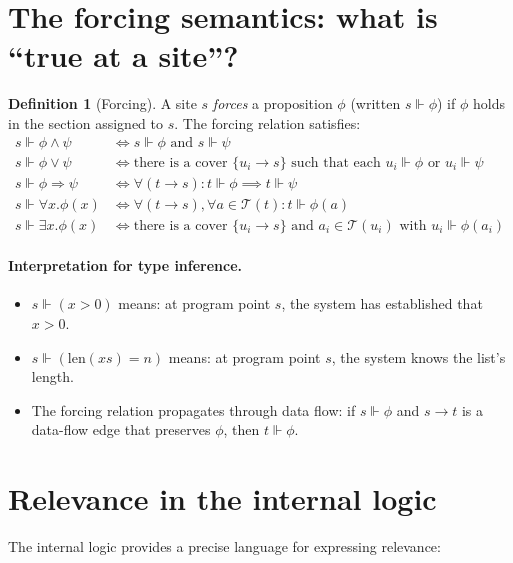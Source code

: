 \documentclass[11pt]{report}
\theoremstyle{definition}
\newtheorem{definition}{Definition}[section]
\theoremstyle{plain}
\begin{document}
\section{The forcing semantics: what is ``true at a site''?}

\begin{definition}[Forcing]
A site $s$ \emph{forces} a proposition $\phi$ (written $s \Vdash \phi$) if
$\phi$ holds in the section assigned to $s$. The forcing relation satisfies:
\begin{align*}
  s \Vdash \phi \wedge \psi &\iff s \Vdash \phi \text{ and } s \Vdash \psi \\
  s \Vdash \phi \vee \psi &\iff \text{there is a cover } \{u_i \to s\}
    \text{ such that each } u_i \Vdash \phi \text{ or } u_i \Vdash \psi \\
  s \Vdash \phi \Rightarrow \psi &\iff \forall (t \to s) : t \Vdash \phi
    \implies t \Vdash \psi \\
  s \Vdash \forall x. \phi(x) &\iff \forall (t \to s), \forall a \in
    \mathcal{T}(t) : t \Vdash \phi(a) \\
  s \Vdash \exists x. \phi(x) &\iff \text{there is a cover } \{u_i \to s\}
    \text{ and } a_i \in \mathcal{T}(u_i) \text{ with } u_i \Vdash \phi(a_i)
\end{align*}
\end{definition}

\paragraph{Interpretation for type inference.}
\begin{itemize}[nosep]
  \item $s \Vdash (x > 0)$ means: at program point $s$, the system has
        established that $x > 0$.
  \item $s \Vdash (\mathrm{len}(xs) = n)$ means: at program point $s$, the
        system knows the list's length.
  \item The forcing relation propagates through data flow: if $s \Vdash \phi$
        and $s \to t$ is a data-flow edge that preserves $\phi$, then
        $t \Vdash \phi$.
\end{itemize}

\section{Relevance in the internal logic}

The internal logic provides a precise language for expressing relevance:
\end{document}
